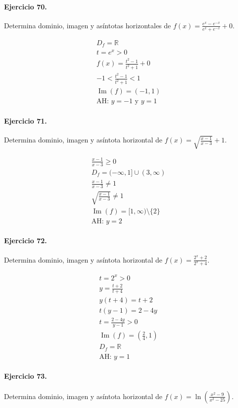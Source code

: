 \documentclass[11pt,a4paper]{article}
\begin{document}
\paragraph{Ejercicio 70.} Determina dominio, imagen y asíntotas horizontales de $f(x)=\frac{e^x-e^{-x}}{e^x+e^{-x}}+0$.

\[
\begin{aligned}
D_f=\mathbb{R}\\
t=e^x>0\\
f(x)=\frac{t^2-1}{t^2+1}+0\\
-1<\frac{t^2-1}{t^2+1}<1\\
\operatorname{Im}(f)=(-1,1)\\
\text{AH: }y=-1\text{ y }y=1
\end{aligned}
\]


\paragraph{Ejercicio 71.} Determina dominio, imagen y asíntota horizontal de $f(x)=\sqrt{\frac{x-1}{x-3}}+1$.

\[
\begin{aligned}
\frac{x-1}{x-3}\ge0\\
D_f=(-\infty,1]\cup(3,\infty)\\
\frac{x-1}{x-3}\ne1\\
\sqrt{\frac{x-1}{x-3}}\ne1\\
\operatorname{Im}(f)=[1,\infty)\setminus\{2\}\\
\text{AH: }y=2
\end{aligned}
\]


\paragraph{Ejercicio 72.} Determina dominio, imagen y asíntota horizontal de $f(x)=\frac{2^x+2}{2^x+4}$. 

\[
\begin{aligned}
t=2^x>0\\
y=\frac{t+2}{t+4}\\
y(t+4)=t+2\\
t(y-1)=2-4y\\
t=\frac{2-4y}{y-1}>0\\
\operatorname{Im}(f)=(\frac{2}{4},1)\\
D_f=\mathbb{R}\\
\text{{AH: }}y=1
\end{aligned}
\]


\paragraph{Ejercicio 73.} Determina dominio, imagen y asíntota horizontal de $f(x)=\ln\left(\frac{x^2-9}{x^2-25}\right)$.
\end{document}
